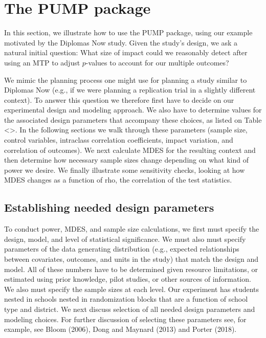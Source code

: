 \documentclass[
]{article}
\begin{document}
\section{The PUMP package}
\label{sec:vignette}

In this section, we illustrate how to use the PUMP package, using our
example motivated by the Diplomas Now study. Given the study's design,
we ask a natural initial question: What size of impact could we
reasonably detect after using an MTP to adjust \(p\)-values to account
for our multiple outcomes?

We mimic the planning process one might use for planning a study similar
to Diplomas Now (e.g., if we were planning a replication trial in a
slightly different context). To answer this question we therefore first
have to decide on our experimental design and modeling approach. We also
have to determine values for the associated design parameters that
accompany these choices, as listed on Table \textless{}\textgreater. In
the following sections we walk through these parameters (sample size,
control variables, intraclass correlation coefficients, impact
variation, and correlation of outcomes). We next calculate MDES for the
resulting context and then determine how necessary sample sizes change
depending on what kind of power we desire. We finally illustrate some
sensitivity checks, looking at how MDES changes as a function of rho,
the correlation of the test statistics.

\subsection{Establishing needed design parameters}

To conduct power, MDES, and sample size calculations, we first must
specify the design, model, and level of statistical significance. We
must also must specify parameters of the data generating distribution
(e.g., expected relationships between covariates, outcomes, and units in
the study) that match the design and model. All of these numbers have to
be determined given resource limitations, or estimated using prior
knowledge, pilot studies, or other sources of information. We also must
specify the sample sizes at each level. Our experiment has students
nested in schools nested in randomization blocks that are a function of
school type and district. We next discuss selection of all needed design
parameters and modeling choices. For further discussion of selecting
these parameters see, for example, see Bloom (2006), Dong and Maynard
(2013) and Porter (2018).
\end{document}
